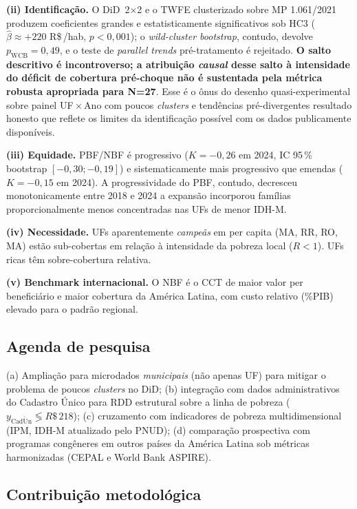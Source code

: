\documentclass[12pt,a4paper,oneside]{article}
\newcommand{\rs}{R\$\,}
\begin{document}
\textbf{(ii) Identificação.} O DiD~2$\times$2 e o TWFE
clusterizado sobre MP 1.061/2021 produzem coeficientes grandes e
estatisticamente significativos sob HC3 ($\hat\beta \approx +220$
\rs/hab, $p < 0,001$); o \textit{wild-cluster bootstrap},
contudo, devolve $p_{\mathrm{WCB}} = 0,49$, e o teste de
\textit{parallel trends} pré-tratamento é rejeitado. \textbf{O
salto descritivo é incontroverso; a atribuição \textit{causal}
desse salto à intensidade do déficit de cobertura pré-choque não é
sustentada pela métrica robusta apropriada para N=27}. Esse é o
ônus do desenho quasi-experimental sobre painel UF\,$\times$\,Ano
com poucos \textit{clusters} e tendências pré-divergentes
\textemdash{} resultado honesto que reflete os limites da
identificação possível com os dados publicamente disponíveis.

\textbf{(iii) Equidade.} PBF/NBF é progressivo
($K = -0,26$ em 2024, IC 95\,\% bootstrap $[-0,30; -0,19]$) e
sistematicamente mais progressivo que emendas
($K = -0,15$ em 2024). A progressividade do PBF, contudo, decresceu
monotonicamente entre 2018 e 2024 \textemdash{} a expansão
incorporou famílias proporcionalmente menos concentradas nas UFs
de menor IDH-M.

\textbf{(iv) Necessidade.} UFs aparentemente \textit{campeãs} em
per capita (MA, RR, RO, MA) estão sub-cobertas em relação à
intensidade da pobreza local ($R < 1$). UFs ricas têm
sobre-cobertura relativa.

\textbf{(v) Benchmark internacional.} O NBF é o CCT de maior valor
per beneficiário e maior cobertura da América Latina, com custo
relativo (\%PIB) elevado para o padrão regional.

\subsection{Agenda de pesquisa}

(a) Ampliação para microdados \textit{municipais} (não apenas UF)
para mitigar o problema de poucos \textit{clusters} no DiD;
(b) integração com dados administrativos do Cadastro Único para
RDD estrutural sobre a linha de pobreza
($y_{\mathrm{Cad\acute{U}n}} \lessgtr \rs 218$);
(c) cruzamento com indicadores de pobreza multidimensional (IPM,
IDH-M atualizado pelo PNUD); (d) comparação prospectiva com
programas congêneres em outros países da América Latina sob
métricas harmonizadas (CEPAL e World Bank ASPIRE).

\subsection{Contribuição metodológica}
\end{document}
